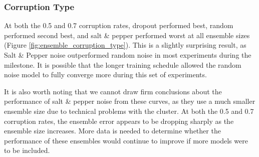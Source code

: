 \documentclass{article} %
\begin{document}
\subsubsection{Corruption Type}

At both the 0.5 and 0.7 corruption rates, dropout performed best, random performed second best, and salt \& pepper performed worst at all ensemble sizes (Figure \ref{fig:ensemble_corruption_type}). This is a slightly surprising result, as Salt \& Pepper noise outperformed random noise in most experiments during the milestone. It is possible that the longer training schedule allowed the random noise model to fully converge more during this set of experiments.

It is also worth noting that we cannot draw firm conclusions about the performance of salt \& pepper noise from these curves, as they use a much smaller ensemble size due to technical problems with the cluster. At both the 0.5 and 0.7 corruption rates, the ensemble error appears to be dropping sharply as the ensemble size increases. More data is needed to determine whether the performance of these ensembles would continue to improve if more models were to be included.
\end{document}
